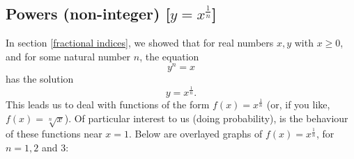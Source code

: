 \subsection{Powers (non-integer)  [$y = x^\frac{1}{n}$]} \label{powers (non-integer)}
In section \ref{fractional indices}, we showed that for real numbers $x,y$ with $x \geq 0$, and for some natural number $n$, the equation
\[
y^n = x
\]
has the solution
\[
y = x^\frac{1}{n}.
\]
This leads us to deal with functions of the form $f(x) = x^\frac{1}{n}$ (or, if you like, $f(x) = \sqrt[n]{x}$). Of particular interest to us (doing probability), is the behaviour of these functions near $x = 1$. Below are overlayed graphs of $f(x) = x^\frac{1}{n}$, for $n = 1,2$ and $3:$
